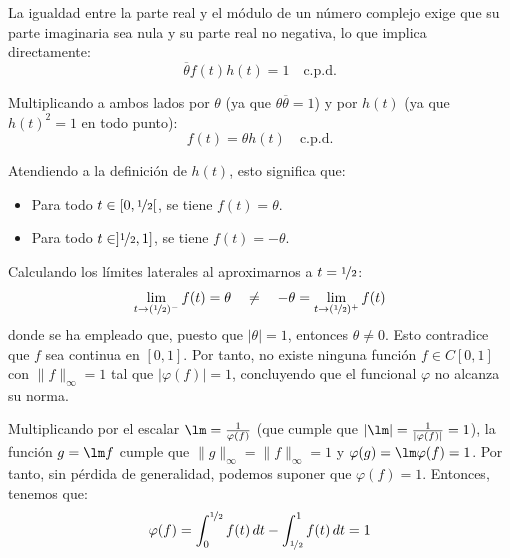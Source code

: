\documentclass[12pt]{article}
\begin{document}
\begin{ejercicio}
\begin{description}
\begin{itemize}
                La igualdad entre la parte real y el módulo de un número complejo exige que su parte imaginaria sea nula y su parte real no negativa, lo que implica directamente:
                \begin{equation*}
                    \overline{\theta} f(t) h(t) = 1 \quad \text{c.p.d.}
                \end{equation*}

                Multiplicando a ambos lados por $\theta$ (ya que $\theta \overline{\theta} = 1$) y por $h(t)$ (ya que $h(t)^2 = 1$ en todo punto):
                \begin{equation*}
                    f(t) = \theta h(t) \quad \text{c.p.d.}
                \end{equation*}
            \end{itemize}

            Atendiendo a la definición de $h(t)$, esto significa que:
            \begin{itemize}
                \item Para todo $t \in [0, \nicefrac{1}{2}[$, se tiene $f(t) = \theta$.
                \item Para todo $t \in ]\nicefrac{1}{2}, 1]$, se tiene $f(t) = -\theta$.
            \end{itemize}

            Calculando los límites laterales al aproximarnos a $t = \nicefrac{1}{2}$:
            \begin{equation*}
                \lim_{t \to (\nicefrac{1}{2})^-} f(t) = \theta \quad \neq \quad -\theta = \lim_{t \to (\nicefrac{1}{2})^+} f(t)
            \end{equation*}
            donde se ha empleado que, puesto que $|\theta|=1$, entonces $\theta\neq 0$. Esto contradice que $f$ sea continua en $[0, 1]$. Por tanto, no existe ninguna función $f \in C[0, 1]$ con $\|f\|_\infty = 1$ tal que $|\varphi(f)| = 1$, concluyendo que el funcional $\varphi$ no alcanza su norma.

            \item[Opción 2.] Multiplicando por el escalar $\lm = \frac{1}{\varphi(f)}$ (que cumple que $|\lm| = \frac{1}{|\varphi(f)|} = 1$), la función $g=\lm f$ cumple que $\|g\|_\infty = \|f\|_\infty = 1$ y $\varphi(g) = \lm \varphi(f) = 1$. Por tanto, sin pérdida de generalidad, podemos suponer que $\varphi(f) = 1$. Entonces, tenemos que:
            \begin{equation*}
                \varphi(f) = \int_0^{\nicefrac{1}{2}} f(t)\,dt - \int_{\nicefrac{1}{2}}^1 f(t)\,dt = 1
            \end{equation*}


\end{description}
\end{ejercicio}
\end{document}

